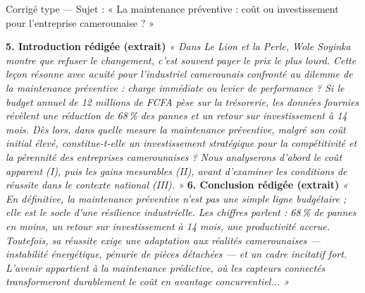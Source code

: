 \documentclass[11pt]{article}
\begin{document}
\begin{exoresolu}{Corrigé type — Sujet : « La maintenance préventive : coût ou investissement pour l'entreprise camerounaise ? »}
\begin{itemize}
\end{itemize}
\textbf{5. Introduction rédigée (extrait)}
\emph{« Dans \emph{Le Lion et la Perle}, Wole Soyinka montre que refuser le changement, c'est souvent payer le prix le plus lourd. Cette leçon résonne avec acuité pour l'industriel camerounais confronté au dilemme de la maintenance préventive : charge immédiate ou levier de performance ? Si le budget annuel de 12 millions de FCFA pèse sur la trésorerie, les données fournies révèlent une réduction de 68\,\% des pannes et un retour sur investissement à 14 mois. Dès lors, dans quelle mesure la maintenance préventive, malgré son coût initial élevé, constitue-t-elle un investissement stratégique pour la compétitivité et la pérennité des entreprises camerounaises ? Nous analyserons d'abord le coût apparent (I), puis les gains mesurables (II), avant d'examiner les conditions de réussite dans le contexte national (III). »}
\textbf{6. Conclusion rédigée (extrait)}
\emph{« En définitive, la maintenance préventive n'est pas une simple ligne budgétaire ; elle est le socle d'une résilience industrielle. Les chiffres parlent : 68\,\% de pannes en moins, un retour sur investissement à 14 mois, une productivité accrue. Toutefois, sa réussite exige une adaptation aux réalités camerounaises — instabilité énergétique, pénurie de pièces détachées — et un cadre incitatif fort. L'avenir appartient à la maintenance prédictive, où les capteurs connectés transformeront durablement le coût en avantage concurrentiel... »}


\end{exoresolu}
\end{document}
